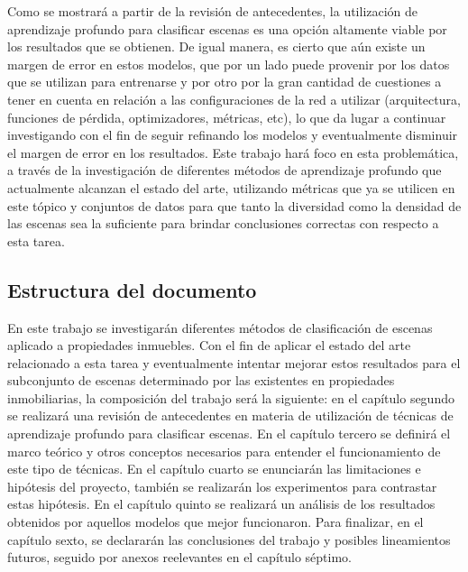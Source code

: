 Como se mostrará a partir de la revisión de antecedentes, la utilización de aprendizaje profundo para clasificar escenas es una opción altamente viable por los resultados que se obtienen. De igual manera, es cierto que aún existe un margen de error en estos modelos, que por un lado puede provenir por los datos que se utilizan para entrenarse y por otro por la gran cantidad de cuestiones a tener en cuenta en relación a las configuraciones de la red a utilizar (arquitectura, funciones de pérdida, optimizadores, métricas, etc), lo que da lugar a continuar investigando con el fin de seguir refinando los modelos y eventualmente disminuir el margen de error en los resultados. Este trabajo hará foco en esta problemática, a través de la investigación de diferentes métodos de aprendizaje profundo que actualmente alcanzan el estado del arte, utilizando métricas que ya se utilicen en este tópico y conjuntos de datos para que tanto la diversidad como la densidad de las escenas sea la suficiente para brindar conclusiones correctas con respecto a esta tarea.


\subsection{Estructura del documento}
En este trabajo se investigarán diferentes métodos de clasificación de escenas aplicado a propiedades inmuebles. Con el fin de aplicar el estado del arte relacionado a esta tarea y eventualmente intentar mejorar estos resultados para el subconjunto de escenas determinado por las existentes en propiedades inmobiliarias, la composición del trabajo será la siguiente: en el capítulo segundo se realizará una revisión de antecedentes en materia de utilización de técnicas de aprendizaje profundo para clasificar escenas. En el capítulo tercero se definirá el marco teórico y otros conceptos necesarios para entender el funcionamiento de este tipo de técnicas. En el capítulo cuarto se enunciarán las limitaciones e hipótesis del proyecto, también se realizarán los experimentos para contrastar estas hipótesis. En el capítulo quinto se realizará un análisis de los resultados obtenidos por aquellos modelos que mejor funcionaron. Para finalizar, en el capítulo sexto, se declararán las conclusiones del trabajo y posibles lineamientos futuros, seguido por anexos reelevantes en el capítulo séptimo.